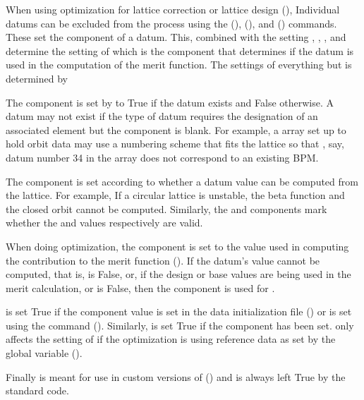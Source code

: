 When using optimization for lattice correction or lattice design
(), Individual datums can be excluded from the process
using the  (),  (),
and  () commands. These set the 
component of a datum. This, combined with the setting ,
, , and 
determine the setting of  which is the component that
determines if the datum is used in the computation of the merit
function. The settings of everything but  is determined
by \tao

The  component is set by \tao to True if the datum exists
and False otherwise. A datum may not exist if the type of datum
requires the designation of an associated element but the
 component is blank. For example, a  array
set up to hold orbit data may use a numbering scheme that fits the
lattice so that , say, datum number 34 in the array does not
correspond to an existing BPM.

The  component is set according to whether a datum
value can be computed from the  lattice. For example, If a
circular lattice is unstable, the beta function and the closed orbit
cannot be computed. Similarly, the  and 
components mark whether the  and  values
respectively are valid.

When doing optimization, the  component is set to the
 value used in computing the contribution to the merit
function (). If the datum's value cannot be
computed, that is,  is False, or, if the design or base
values are being used in the merit calculation,  or
 is False, then the  component is used for
.

 is set True if the  component value is set in
the data initialization file () or is set using the
 command (). Similarly,  is set True
if the  component has been set.  only affects the
setting of  if the optimization is using reference data
as set by the global variable  ().

Finally  is meant for use in custom versions of \tao
() and is always left True by the standard \tao code.

